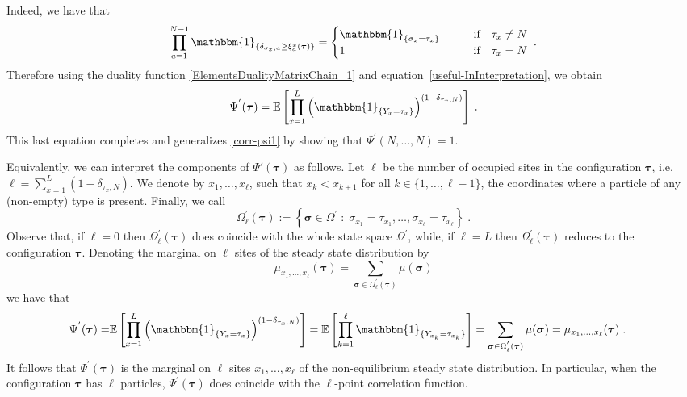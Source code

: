 \documentclass[10pt]{article}
\numberwithin{equation}{section}
\numberwithin{equation}{subsection}
\newcommand{\dt}{\;.}
\begin{document}
Indeed, we have that 
\begin{equation}
	\prod_{a=1}^{N-1}\mathbbm{1}_{\{\delta_{\sigma_{x},a}\geq\xi_{a}^{x}(\bm{\tau})\}}=\begin{cases}
		\mathbbm{1}_{\{\sigma_{x}=\tau_{x}\}}\qquad &\text{if}\quad \tau_{x}\neq N\\
		1\qquad  &\text{if}\quad \tau_{x}= N
	\end{cases}\dt
\end{equation}
Therefore using the duality function \eqref{ElementsDualityMatrixChain_1} and equation~\ref{useful-InInterpretation}, we obtain 
\begin{equation}%
	\Psi^{'}(\bm{\tau})=\mathbb{E}\left[\prod_{x=1}^{L}\left(\mathbbm{1}_{\{Y_{x}=\tau_{x}\}} \right)^{(1-\delta_{\tau_{x},N})}\right]\dt
\end{equation} 
This last equation completes and generalizes \eqref{corr-psi1} by showing that $\Psi^{'}(N,\ldots,N) =1$.

Equivalently, we can interpret the components of $\Psi'(\bm{\tau})$ as follows.
Let $\ell$ be the number of occupied sites in the configuration $\bm{\tau}$, i.e.  $\ell=\sum_{x=1}^{L}(1-\delta_{\tau_{x},N})$. We denote by $x_{1},\ldots,x_{\ell}$, such that $x_{k}<x_{k+1}$ for all $k\in \{1,\ldots,\ell-1\}$, the coordinates where a particle of any (non-empty) type is present. Finally, we call 
\begin{equation}
	\Omega_{\ell}^{'}(\bm{\tau}):=\left\{\bm{\sigma}\in \Omega^{'}\;:\; \sigma_{x_{1}}=\tau_{x_{1}},\ldots,\sigma_{x_{\ell}}=\tau_{x_{\ell}}\right\}\dt
\end{equation} 
Observe that, if $\ell=0$ then $\Omega_{\ell}^{'}(\bm{\tau})$ does coincide with the whole state space $\Omega^{'}$, while, if $\ell=L$ then $\Omega_{\ell}^{'}(\bm{\tau})$ reduces to the configuration $\bm{\tau}$. Denoting the marginal on $\ell$ sites of the steady state distribution by 
\begin{equation}
	\mu_{x_{1},\ldots,x_{\ell}}(\bm{\tau})=\sum_{\bm{\sigma}\in \Omega_{\ell}^{'}(\bm{\tau})}\mu(\bm{\sigma})
\end{equation}
we have that 
\begin{align}
	\Psi^{'}(\bm{\tau})=&\mathbb{E}\left[\prod_{x=1}^{L}\left(\mathbbm{1}_{\{Y_{x}=\tau_{x}\}} \right)^{(1-\delta_{\tau_{x},N})}\right]=\mathbb{E}\left[\prod_{k=1}^{\ell}\mathbbm{1}_{\{Y_{x_{k}}=\tau_{x_{k}}\}}\right]=\sum_{\bm{\sigma}\in \Omega_{\ell}^{'}(\bm{\tau})}\mu(\bm{\sigma})=\mu_{x_{1},\ldots,x_{\ell}}(\bm{\tau})\dt
\end{align} 
It follows that $\Psi^{'}(\bm{\tau})$ is the marginal on $\ell$ sites $x_{1},\ldots,x_{\ell}$ of the non-equilibrium steady state distribution. In particular, when the configuration $\bm{\tau}$ has $\ell$ particles, $\Psi^{'}(\bm{\tau})$ does coincide with the $\ell$-point correlation function. 
\end{document}
